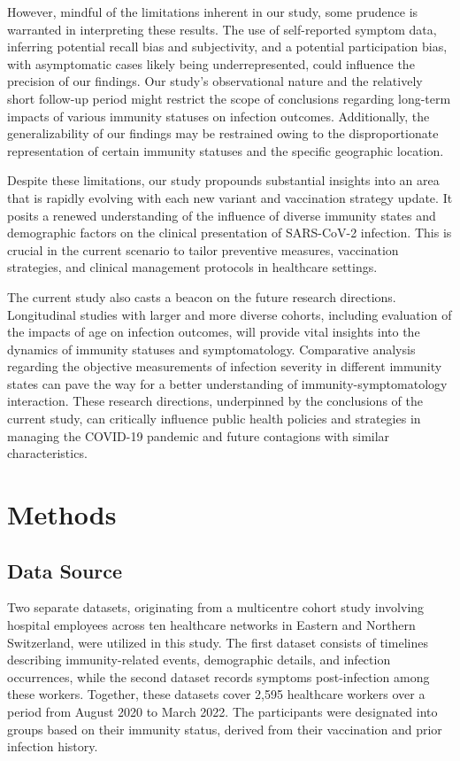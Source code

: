 \documentclass[11pt]{article}
\begin{document}
However, mindful of the limitations inherent in our study, some prudence is warranted in interpreting these results. The use of self-reported symptom data, inferring potential recall bias and subjectivity, and a potential participation bias, with asymptomatic cases likely being underrepresented, could influence the precision of our findings. Our study's observational nature and the relatively short follow-up period might restrict the scope of conclusions regarding long-term impacts of various immunity statuses on infection outcomes. Additionally, the generalizability of our findings may be restrained owing to the disproportionate representation of certain immunity statuses and the specific geographic location.

Despite these limitations, our study propounds substantial insights into an area that is rapidly evolving with each new variant and vaccination strategy update. It posits a renewed understanding of the influence of diverse immunity states and demographic factors on the clinical presentation of SARS-CoV-2 infection. This is crucial in the current scenario to tailor preventive measures, vaccination strategies, and clinical management protocols in healthcare settings.

The current study also casts a beacon on the future research directions. Longitudinal studies with larger and more diverse cohorts, including evaluation of the impacts of age on infection outcomes, will provide vital insights into the dynamics of immunity statuses and symptomatology. Comparative analysis regarding the objective measurements of infection severity in different immunity states can pave the way for a better understanding of immunity-symptomatology interaction. These research directions, underpinned by the conclusions of the current study, can critically influence public health policies and strategies in managing the COVID-19 pandemic and future contagions with similar characteristics.

\section*{Methods}

\subsection*{Data Source}
Two separate datasets, originating from a multicentre cohort study involving hospital employees across ten healthcare networks in Eastern and Northern Switzerland, were utilized in this study. The first dataset consists of timelines describing immunity-related events, demographic details, and infection occurrences, while the second dataset records symptoms post-infection among these workers. Together, these datasets cover 2,595 healthcare workers over a period from August 2020 to March 2022. The participants were designated into groups based on their immunity status, derived from their vaccination and prior infection history.
\end{document}
